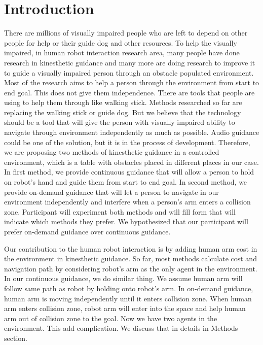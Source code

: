 \section{Introduction}
There are millions of visually impaired people who are left to depend on other people for help or their guide dog and other resources. To help the visually impaired, in human robot interaction research area, many people have done research in kinesthetic guidance and many more are doing research to improve it to guide a visually impaired person through an obstacle populated environment. Most of the research aims to help a person through the environment from start to end goal. This does not give them independence. There are tools that people are using to help them through like walking stick. Methods researched so far are replacing the walking stick or guide dog. But we believe that the technology should be a tool that will give the person with visually impaired ability to navigate through environment independently as much as possible. Audio guidance could be one of the solution, but it is in the process of development. Therefore, we are proposing two methods of kinesthetic guidance in a controlled environment, which is a table with obstacles placed in different places in our case. In first method, we provide continuous guidance that will allow a person to hold on robot's hand and guide them from start to end goal. In second method, we provide on-demand guidance that will let a person to navigate in our environment independently and interfere when a person's arm enters a collision zone. Participant will experiment both methods and will fill form that will indicate which methods they prefer. We hypothesized that our participant will prefer on-demand guidance over continuous guidance.

Our contribution to the human robot interaction is by adding human arm cost in the environment in kinesthetic guidance. 
So far, most methods calculate cost and navigation path by considering robot's arm as the only agent in the environment. 
In our continuous guidance, we do similar thing. 
We assume human arm will follow same path as robot by holding onto robot's arm. 
In on-demand guidance, human arm is moving independently until it enters collision zone. When human arm enters collision zone, robot arm will enter into the space and help human arm out of collision zone to the goal. 
Now we have two agents in the environment. This add complication. We discuss that in details in Methods section. 

